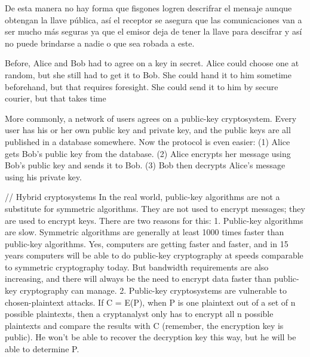 De esta manera no hay forma que fisgones logren descrifrar el mensaje aunque obtengan la llave pública, así el receptor se asegura que las comunicaciones van a ser mucho más seguras ya que el emisor deja de tener la llave para descifrar y así no puede brindarse a nadie o que sea robada a este.



Before, Alice and Bob had to agree on a key in
secret. Alice could choose one at random, but she still had to get it to Bob. She
could hand it to him sometime beforehand, but that requires foresight. She
could send it to him by secure courier, but that takes time

More commonly, a network of users agrees on a public-key cryptosystem.
Every user has his or her own public key and private key, and the public keys
are all published in a database somewhere. Now the protocol is even easier:
(1) Alice gets Bob’s public key from the database.
(2) Alice encrypts her message using Bob’s public key and sends it to
Bob.
(3) Bob then decrypts Alice’s message using his private key.











// Hybrid cryptosystems
In the real world, public-key algorithms are not a substitute for symmetric
algorithms. They are not used to encrypt messages; they are used to encrypt
keys. There are two reasons for this:
1. Public-key algorithms are slow. Symmetric algorithms are generally
at least 1000 times faster than public-key algorithms. Yes, computers
are getting faster and faster, and in 15 years computers will be able to do
public-key cryptography at speeds comparable to symmetric
cryptography today. But bandwidth requirements are also increasing,
and there will always be the need to encrypt data faster than public-key
cryptography can manage.
2. Public-key cryptosystems are vulnerable to chosen-plaintext attacks.
If C = E(P), when P is one plaintext out of a set of n possible plaintexts,
then a cryptanalyst only has to encrypt all n possible plaintexts and
compare the results with C (remember, the encryption key is public). He
won’t be able to recover the decryption key this way, but he will be able
to determine P.


